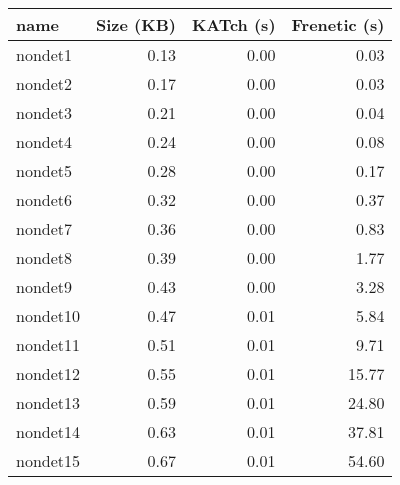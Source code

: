 \begin{tabular}{lrrr}
\toprule
name & Size (KB) & KATch (s) & Frenetic (s) \\
\midrule
nondet1 & 0.13 & 0.00 & 0.03 \\
nondet2 & 0.17 & 0.00 & 0.03 \\
nondet3 & 0.21 & 0.00 & 0.04 \\
nondet4 & 0.24 & 0.00 & 0.08 \\
nondet5 & 0.28 & 0.00 & 0.17 \\
nondet6 & 0.32 & 0.00 & 0.37 \\
nondet7 & 0.36 & 0.00 & 0.83 \\
nondet8 & 0.39 & 0.00 & 1.77 \\
nondet9 & 0.43 & 0.00 & 3.28 \\
nondet10 & 0.47 & 0.01 & 5.84 \\
nondet11 & 0.51 & 0.01 & 9.71 \\
nondet12 & 0.55 & 0.01 & 15.77 \\
nondet13 & 0.59 & 0.01 & 24.80 \\
nondet14 & 0.63 & 0.01 & 37.81 \\
nondet15 & 0.67 & 0.01 & 54.60 \\
\bottomrule
\end{tabular}
